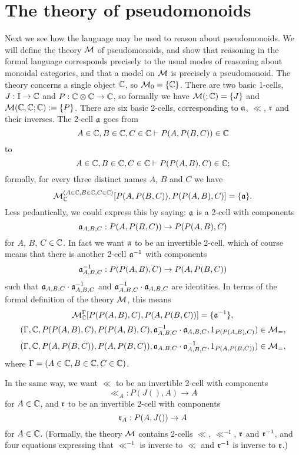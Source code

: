 \documentclass{robinthesisdraft}
\begin{document}
\section{The theory of pseudomonoids}
Next we see how the language may be used to reason about pseudomonoids.
We will define the theory $\M$ of pseudomonoids, and show that reasoning
in the formal language corresponds precisely to the usual modes of reasoning
about monoidal categories, and that a model on $\M$ is precisely a pseudomonoid.
The theory concerns
a single object $\C$, so $\M_{0} = \{\C\}$. There are two basic 1-cells,
$J:\I\to\C$ and $P:\C\tn\C\to\C$, so formally we have $\M(;\C) = \{J\}$
and $\M(\C,\C;\C):=\{P\}$. There are six basic 2-cells, corresponding to
$\aa$, $\ll$, $\rr$ and their inverses. The 2-cell $\aa$ goes from
\[
	A\in\C, B\in\C, C\in\C \proves P(A,P(B,C))\in\C
\]
to
\[
	A\in\C, B\in\C, C\in\C \proves P(P(A,B),C)\in\C;
\]
formally, for every three distinct names $A$, $B$ and $C$ we have
\[\M^{(A\in\C,B\in\C,C\in\C)}_{\C}[P(A,P(B,C)),P(P(A,B),C)] = \{\aa\}.\]
Less pedantically, we could
express this by saying: $\aa$ is a 2-cell with components
\[
	\aa_{A,B,C}: P(A,P(B,C)) \to P(P(A,B),C)
\]
for $A$, $B$, $C\in\C$.
In fact we want $\aa$ to be an invertible 2-cell, which of course
means that there is another 2-cell $\aa^{-1}$ with components
\[
	\aa^{-1}_{A,B,C}: P(P(A,B),C) \to P(A,P(B,C))
\]
such that $\aa_{A,B,C}\cdot\aa^{-1}_{A,B,C}$ and
$\aa^{-1}_{A,B,C}\cdot\aa_{A,B,C}$ are identities.
In terms of the formal definition of the theory $\M$, this means
\[\M^\Gamma_{\C}[P(P(A,B),C),P(A,P(B,C))] = \{\aa^{-1}\},\]
\[(\Gamma,\C,P(P(A,B),C),P(P(A,B),C),\aa^{-1}_{A,B,C}\cdot\aa_{A,B,C},
1_{P(P(A,B),C)})\in\M_{=},\]
\[(\Gamma,\C,P(A,P(B,C)),P(A,P(B,C)),\aa_{A,B,C}\cdot\aa^{-1}_{A,B,C},
1_{P(A,P(B,C))})\in\M_{=},\]
where $\Gamma=(A\in\C,B\in\C,C\in\C)$.

In the same way, we want $\ll$ to be an invertible 2-cell with
components
\[
	\ll_{A}: P(J(),A) \to A
\]
for $A\in\C$, and $\rr$ to be an invertible 2-cell with
components
\[
	\rr_{A}: P(A,J()) \to A
\]
for $A\in\C$. (Formally, the theory $\M$ contains 2-cells $\ll$,
$\ll^{-1}$, $\rr$ and $\rr^{-1}$, and four equations expressing
that $\ll^{-1}$ is inverse to $\ll$ and $\rr^{-1}$ is inverse to $\rr$.)
\end{document}
